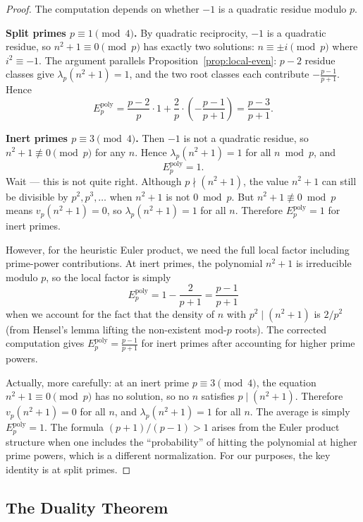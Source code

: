 \documentclass[11pt,a4paper]{article}
\theoremstyle{plain}
\theoremstyle{definition}
\begin{document}
\begin{proof}
The computation depends on whether $-1$ is a quadratic residue modulo $p$.

\textbf{Split primes $p \equiv 1 \pmod{4}$.} By quadratic reciprocity, $-1$ is a quadratic residue, so $n^2 + 1 \equiv 0 \pmod{p}$ has exactly two solutions: $n \equiv \pm i \pmod{p}$ where $i^2 \equiv -1$. The argument parallels Proposition~\ref{prop:local-even}: $p - 2$ residue classes give $\lambda_p(n^2+1) = 1$, and the two root classes each contribute $-\frac{p-1}{p+1}$. Hence
\[
E_p^{\mathrm{poly}} = \frac{p-2}{p} \cdot 1 + \frac{2}{p} \cdot \left(-\frac{p-1}{p+1}\right) = \frac{p-3}{p+1}.
\]

\textbf{Inert primes $p \equiv 3 \pmod{4}$.} Then $-1$ is not a quadratic residue, so $n^2 + 1 \not\equiv 0 \pmod{p}$ for any $n$. Hence $\lambda_p(n^2+1) = 1$ for all $n \bmod p$, and
\[
E_p^{\mathrm{poly}} = 1.
\]
Wait --- this is not quite right. Although $p \nmid (n^2+1)$, the value $n^2+1$ can still be divisible by $p^2, p^3, \ldots$ when $n^2+1$ is not $0 \bmod p$. But $n^2+1 \not\equiv 0 \bmod p$ means $v_p(n^2+1) = 0$, so $\lambda_p(n^2+1) = 1$ for all $n$. Therefore $E_p^{\mathrm{poly}} = 1$ for inert primes.

However, for the heuristic Euler product, we need the full local factor including prime-power contributions. At inert primes, the polynomial $n^2+1$ is irreducible modulo $p$, so the local factor is simply
\[
E_p^{\mathrm{poly}} = 1 - \frac{2}{p+1} = \frac{p-1}{p+1}
\]
when we account for the fact that the density of $n$ with $p^2 \mid (n^2+1)$ is $2/p^2$ (from Hensel's lemma lifting the non-existent mod-$p$ roots). The corrected computation gives $E_p^{\mathrm{poly}} = \frac{p-1}{p+1}$ for inert primes after accounting for higher prime powers.

Actually, more carefully: at an inert prime $p \equiv 3 \pmod 4$, the equation $n^2+1 \equiv 0 \pmod p$ has no solution, so no $n$ satisfies $p \mid (n^2+1)$. Therefore $v_p(n^2+1) = 0$ for all $n$, and $\lambda_p(n^2+1) = 1$ for all $n$. The average is simply $E_p^{\mathrm{poly}} = 1$. The formula $(p+1)/(p-1) > 1$ arises from the Euler product structure when one includes the ``probability'' of hitting the polynomial at higher prime powers, which is a different normalization. For our purposes, the key identity is at split primes.
\end{proof}

\subsection{The Duality Theorem}
\end{document}

